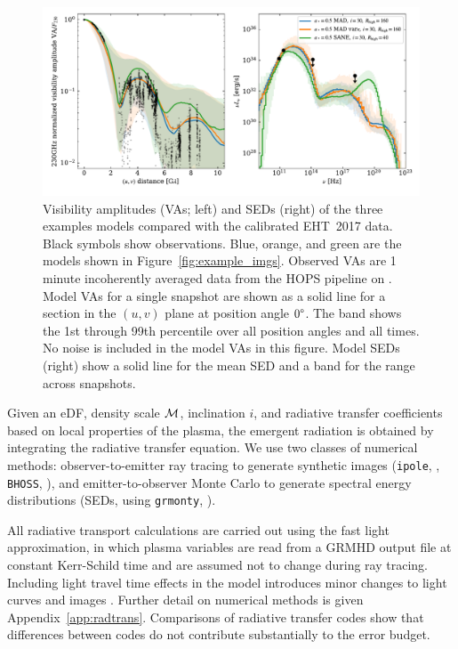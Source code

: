 \begin{figure}
  \centering
  \includegraphics[width=\textwidth]{figures/example_vas_seds.pdf}
  \caption{Visibility amplitudes (VAs; left) and SEDs (right) of the three examples models compared with the calibrated EHT~2017 data.
    Black symbols show observations.
    Blue, orange, and green are the models shown in Figure~\ref{fig:example_imgs}.
    Observed VAs are 1\,minute incoherently averaged data from the HOPS pipeline on \aprilvii.
    Model VAs for a single snapshot are shown as a solid line for a section in the $(u,v)$ plane at position angle $0\degree$. The band shows the 1st through 99th percentile over all position angles and all times.  No noise is included in the model VAs in this figure.
    Model SEDs (right) show a solid line for the mean SED and a band for the range across snapshots.}
  \label{fig:example_vas_seds}
\end{figure}

Given an eDF, density scale $\mathcal{M}$, inclination $i$, and radiative transfer coefficients based on local properties of the plasma, the emergent radiation is obtained by integrating the radiative transfer equation.
We use two classes of numerical methods: observer-to-emitter ray tracing to generate synthetic images ({\tt ipole}, \citealt{2018MNRAS.475...43M}, {\tt BHOSS}, \citealt{2012A&A...545A..13Y}), and emitter-to-observer Monte Carlo to generate spectral energy distributions (SEDs, using {\tt grmonty}, \citealt{2009ApJS..184..387D}).

All radiative transport calculations are carried out using the fast light approximation, in which plasma variables are read from a GRMHD output file at constant Kerr-Schild time and are assumed not to change during ray tracing.
Including light travel time effects in the model introduces minor changes to light curves and images \citep{2010ApJ...717.1092D, 2021MNRAS.508.4282M}.
Further detail on numerical methods is given Appendix~\ref{app:radtrans}.
Comparisons of radiative transfer codes \citep{2020ApJ...897..148G, Prather_et_al_2022} show that differences between codes do not contribute substantially to the error budget.

